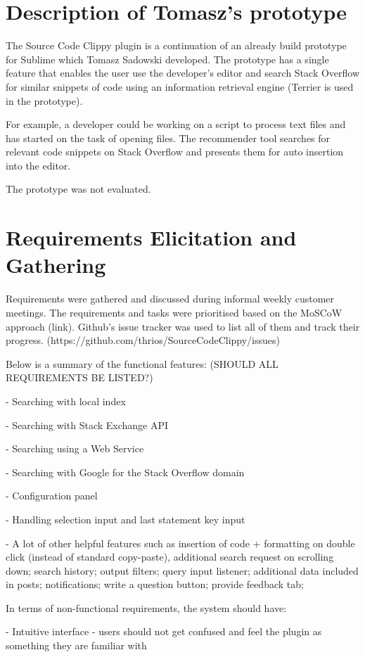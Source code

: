 \documentclass{l4proj}
\begin{document}
\section{Description of Tomasz's prototype}
The Source Code Clippy plugin is a continuation of an already build prototype for Sublime which Tomasz Sadowski developed. The prototype has a single feature that enables the user use the developer's editor and search Stack Overflow for similar snippets of code using an information retrieval engine (Terrier is used in the prototype). 

For example, a developer could be working on a script to process text files and has started on the task of opening files. The recommender tool searches for relevant code snippets on Stack Overflow and presents them for auto insertion into the editor. 

The prototype was not evaluated.

\section{Requirements Elicitation and Gathering}
Requirements were gathered and discussed during informal weekly customer meetings.
The requirements and tasks were prioritised based on the MoSCoW approach (link). Github's issue tracker was used to list all of them and track their progress. (https://github.com/thrios/SourceCodeClippy/issues)

Below is a summary of the functional features: (SHOULD ALL REQUIREMENTS BE LISTED?)

- Searching with local index

- Searching with Stack Exchange API

- Searching using a Web Service

- Searching with Google for the Stack Overflow domain

- Configuration panel

- Handling selection input and last statement key input

- A lot of other helpful features such as insertion of code + formatting on double click (instead of standard copy-paste), additional search request on scrolling down; search history; output filters; query input listener; additional data included in posts; notifications; write a question button; provide feedback tab;

In terms of non-functional requirements, the system should have:

- Intuitive interface - users should not get confused and feel the plugin as something they are familiar with
\end{document}

